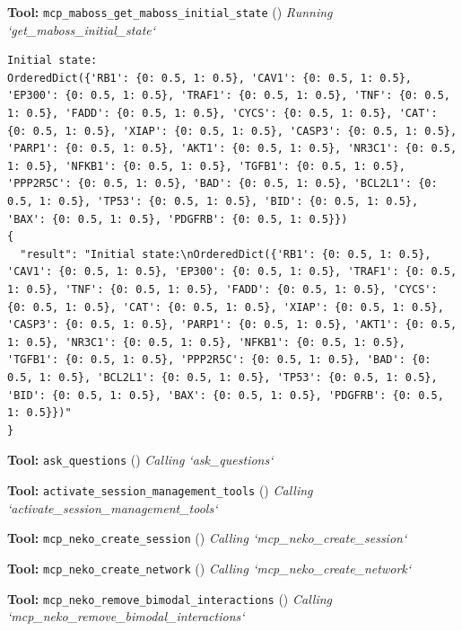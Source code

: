 \documentclass[11pt,a4paper]{article}
\begin{document}
\begin{toolokbox}
\textbf{Tool:} \texttt{mcp\_maboss\_get\_maboss\_initial\_state} (\checkmark)
\textit{Running `get\_maboss\_initial\_state`}
\begin{lstlisting}
Initial state:
OrderedDict({'RB1': {0: 0.5, 1: 0.5}, 'CAV1': {0: 0.5, 1: 0.5}, 'EP300': {0: 0.5, 1: 0.5}, 'TRAF1': {0: 0.5, 1: 0.5}, 'TNF': {0: 0.5, 1: 0.5}, 'FADD': {0: 0.5, 1: 0.5}, 'CYCS': {0: 0.5, 1: 0.5}, 'CAT': {0: 0.5, 1: 0.5}, 'XIAP': {0: 0.5, 1: 0.5}, 'CASP3': {0: 0.5, 1: 0.5}, 'PARP1': {0: 0.5, 1: 0.5}, 'AKT1': {0: 0.5, 1: 0.5}, 'NR3C1': {0: 0.5, 1: 0.5}, 'NFKB1': {0: 0.5, 1: 0.5}, 'TGFB1': {0: 0.5, 1: 0.5}, 'PPP2R5C': {0: 0.5, 1: 0.5}, 'BAD': {0: 0.5, 1: 0.5}, 'BCL2L1': {0: 0.5, 1: 0.5}, 'TP53': {0: 0.5, 1: 0.5}, 'BID': {0: 0.5, 1: 0.5}, 'BAX': {0: 0.5, 1: 0.5}, 'PDGFRB': {0: 0.5, 1: 0.5}})
{
  "result": "Initial state:\nOrderedDict({'RB1': {0: 0.5, 1: 0.5}, 'CAV1': {0: 0.5, 1: 0.5}, 'EP300': {0: 0.5, 1: 0.5}, 'TRAF1': {0: 0.5, 1: 0.5}, 'TNF': {0: 0.5, 1: 0.5}, 'FADD': {0: 0.5, 1: 0.5}, 'CYCS': {0: 0.5, 1: 0.5}, 'CAT': {0: 0.5, 1: 0.5}, 'XIAP': {0: 0.5, 1: 0.5}, 'CASP3': {0: 0.5, 1: 0.5}, 'PARP1': {0: 0.5, 1: 0.5}, 'AKT1': {0: 0.5, 1: 0.5}, 'NR3C1': {0: 0.5, 1: 0.5}, 'NFKB1': {0: 0.5, 1: 0.5}, 'TGFB1': {0: 0.5, 1: 0.5}, 'PPP2R5C': {0: 0.5, 1: 0.5}, 'BAD': {0: 0.5, 1: 0.5}, 'BCL2L1': {0: 0.5, 1: 0.5}, 'TP53': {0: 0.5, 1: 0.5}, 'BID': {0: 0.5, 1: 0.5}, 'BAX': {0: 0.5, 1: 0.5}, 'PDGFRB': {0: 0.5, 1: 0.5}})"
}
\end{lstlisting}
\end{toolokbox}
\begin{toolokbox}
\textbf{Tool:} \texttt{ask\_questions} (\checkmark)
\textit{Calling `ask\_questions`}
\end{toolokbox}
\begin{toolokbox}
\textbf{Tool:} \texttt{activate\_session\_management\_tools} (\checkmark)
\textit{Calling `activate\_session\_management\_tools`}
\end{toolokbox}
\begin{toolokbox}
\textbf{Tool:} \texttt{mcp\_neko\_create\_session} (\checkmark)
\textit{Calling `mcp\_neko\_create\_session`}
\end{toolokbox}
\begin{toolokbox}
\textbf{Tool:} \texttt{mcp\_neko\_create\_network} (\checkmark)
\textit{Calling `mcp\_neko\_create\_network`}
\end{toolokbox}
\begin{toolokbox}
\textbf{Tool:} \texttt{mcp\_neko\_remove\_bimodal\_interactions} (\checkmark)
\textit{Calling `mcp\_neko\_remove\_bimodal\_interactions`}
\end{toolokbox}
\end{document}
